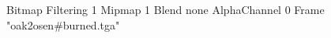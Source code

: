 {Bitmap
	{Filtering 1}
	{Mipmap 1}
	{Blend none}
	{AlphaChannel 0}
	{Frame "oak2osen#burned.tga"}
}
